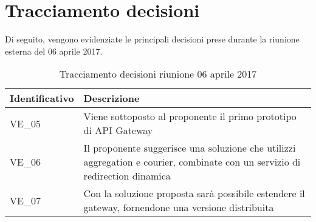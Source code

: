 \section{Tracciamento decisioni}
Di seguito, vengono evidenziate le principali decisioni prese durante la riunione esterna del 06 aprile 2017.

\begin{table}[H]
	\begin{center}
		\begin{tabular}{|p{3cm}| p{11cm}|}
			\hline
			\textbf{Identificativo}	& \textbf{Descrizione} \\
			\hline
			VE\_05	& Viene sottoposto al proponente il primo prototipo di API Gateway \\
			\hline
			VE\_06 &  Il proponente suggerisce una soluzione che utilizzi aggregation e courier, combinate con un servizio di redirection dinamica \\
			\hline
			VE\_07 & Con la soluzione proposta sarà possibile estendere il gateway, fornendone una versione distribuita\\
			\hline
		\end{tabular}
		\caption{Tracciamento decisioni riunione 06 aprile 2017}
	\end{center}
\end{table}